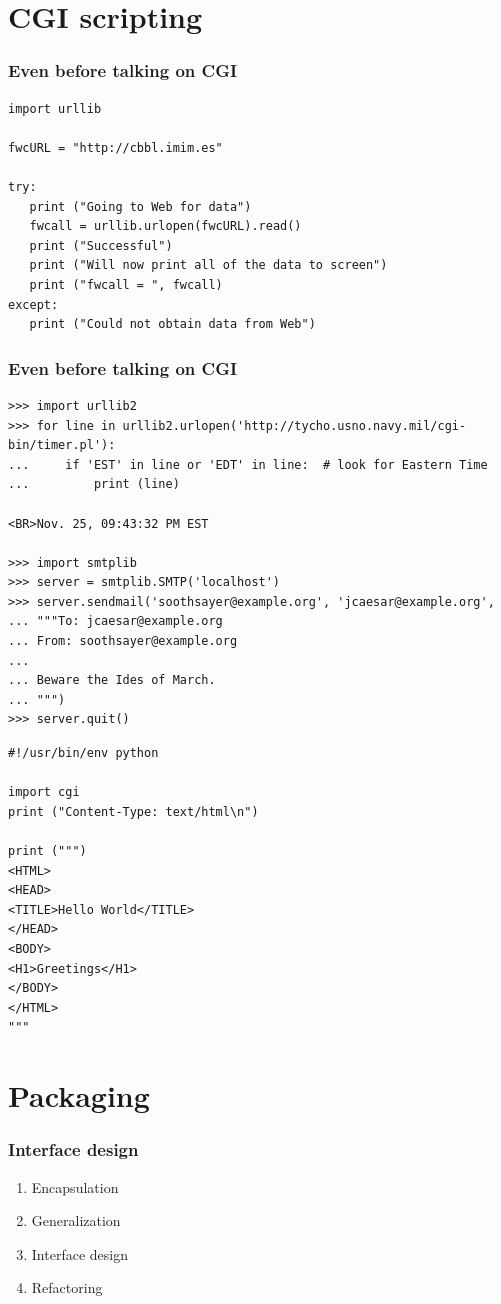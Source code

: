 \documentclass{beamer}
\begin{document}
\section{CGI scripting}

\begin{frame}[containsverbatim]
\frametitle{Even before talking on CGI}
\begin{lstlisting}
import urllib

fwcURL = "http://cbbl.imim.es"

try:
   print ("Going to Web for data")
   fwcall = urllib.urlopen(fwcURL).read()
   print ("Successful")
   print ("Will now print all of the data to screen")
   print ("fwcall = ", fwcall)
except:
   print ("Could not obtain data from Web")
\end{lstlisting}
\end{frame}


\begin{frame}[containsverbatim]
\frametitle{Even before talking on CGI}
\small
\begin{lstlisting}
>>> import urllib2
>>> for line in urllib2.urlopen('http://tycho.usno.navy.mil/cgi-bin/timer.pl'):
...     if 'EST' in line or 'EDT' in line:  # look for Eastern Time
...         print (line)

<BR>Nov. 25, 09:43:32 PM EST

>>> import smtplib
>>> server = smtplib.SMTP('localhost')
>>> server.sendmail('soothsayer@example.org', 'jcaesar@example.org',
... """To: jcaesar@example.org
... From: soothsayer@example.org
...
... Beware the Ides of March.
... """)
>>> server.quit()
\end{lstlisting}
\normalsize
\end{frame}

\begin{frame}[containsverbatim]
\begin{lstlisting}
#!/usr/bin/env python

import cgi
print ("Content-Type: text/html\n")

print (""")
<HTML>
<HEAD>
<TITLE>Hello World</TITLE>
</HEAD>
<BODY>
<H1>Greetings</H1>
</BODY>
</HTML>
"""
\end{lstlisting}
\end{frame}

\section{Packaging}

\begin{frame}
\frametitle{Interface design}
\begin{enumerate}
\item Encapsulation
\item Generalization
\item Interface design
\item Refactoring
\end{enumerate}
\end{frame}
\end{document}
